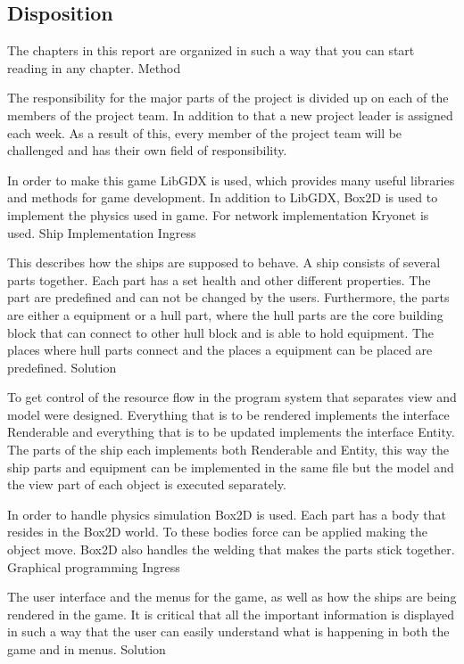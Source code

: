 \documentclass[11pt]{report}
\begin{document}
\subsection{Disposition}

The chapters in this report are organized in such a way that you can start reading in any chapter. 
Method

The responsibility for the major parts of the project is divided up on each of the members of the project team. In addition to that a new project leader is assigned each week. As a result of this, every member of the project team will be challenged and has their own field of responsibility. 

In order to make this game LibGDX is used, which provides many useful libraries and methods for game development. In addition to LibGDX, Box2D is used to implement the physics used in game. For network implementation Kryonet is used.
Ship Implementation
Ingress

This describes how the ships are supposed to behave. A ship consists of several parts together. Each part has a set health and other different properties. The part are predefined and can not be changed by the users. Furthermore, the parts are either a equipment or a hull part, where the hull parts are the core building block that can connect to other hull block and is able to hold equipment. The places where hull parts connect and the places a equipment can be placed are predefined.
Solution

To get control of the resource flow in the program system that separates view and model were designed. Everything that is to be rendered implements the interface Renderable and everything that is to be updated implements the interface Entity. The parts of the ship each implements both Renderable and Entity, this way the ship parts and equipment can be implemented in the same file but the model and the view part of each object is executed separately.

In order to handle physics simulation Box2D is used. Each part has a body that resides in the Box2D world. To these bodies force can be applied making the object move. Box2D also handles the welding that makes the parts stick together.
Graphical programming
Ingress 

The user interface and the menus for the game, as well as how the ships are being rendered in the game. It is critical that all the important information is displayed in such a way that the user can easily understand what is happening in both the game and in menus.
Solution
\end{document}
